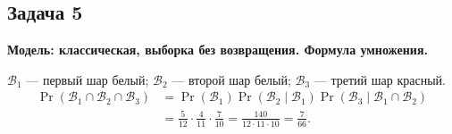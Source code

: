 \subsection{Задача 5}

\begin{solution}
    \textbf{Модель: классическая, выборка без возвращения.
    Формула умножения.}

    $\mathcal{B}_1$ --- первый шар белый;
    $\mathcal{B}_2$ --- второй шар белый;
    $\mathcal{B}_3$ --- третий шар красный.
    \[
        \begin{aligned}
            \Pr(\mathcal{B}_1\cap\mathcal{B}_2\cap\mathcal{B}_3)
            &=\Pr(\mathcal{B}_1)
              \Pr(\mathcal{B}_2\mid\mathcal{B}_1)
              \Pr(\mathcal{B}_3\mid\mathcal{B}_1\cap\mathcal{B}_2)\\
            &=\frac5{12}\cdot\frac4{11}\cdot\frac7{10}
              =\frac{140}{12\cdot11\cdot10}
              =\boxed{\frac7{66}}.
        \end{aligned}
    \]
\end{solution}
